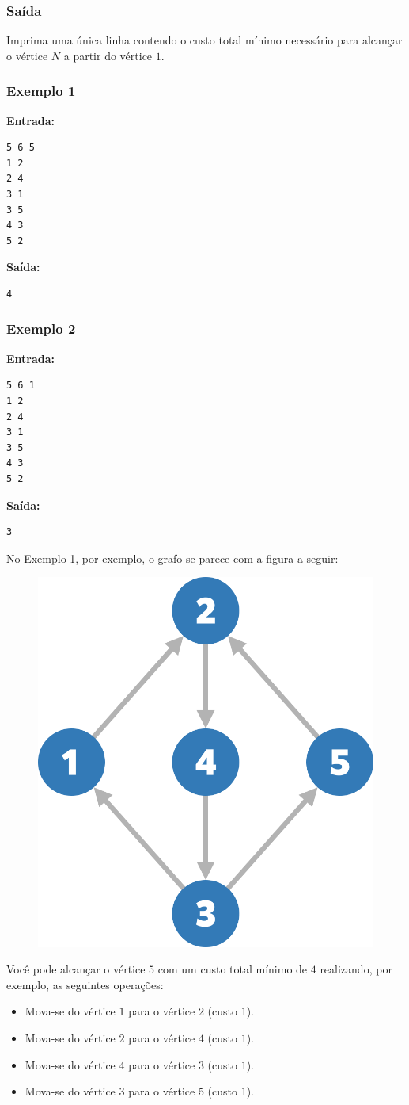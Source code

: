 \subsubsection*{Saída}
Imprima uma única linha contendo o custo total mínimo necessário para alcançar o vértice \(N\) a partir do vértice \(1\).

\subsubsection*{Exemplo 1}
\textbf{Entrada:}
\begin{verbatim}
5 6 5
1 2
2 4
3 1
3 5
4 3
5 2
\end{verbatim}
\textbf{Saída:}
\begin{verbatim}
4
\end{verbatim}

\subsubsection*{Exemplo 2}
\textbf{Entrada:}
\begin{verbatim}
5 6 1
1 2
2 4
3 1
3 5
4 3
5 2
\end{verbatim}
\textbf{Saída:}
\begin{verbatim}
3
\end{verbatim}

No Exemplo 1, por exemplo, o grafo se parece com a figura a seguir:

\begin{figure}
    \centering
    \includegraphics[width=0.5\linewidth]{flipEdge.png}
    \label{fig:enter-label}
\end{figure}

Você pode alcançar o vértice \(5\) com um custo total mínimo de \(4\) realizando, por exemplo, as seguintes operações:
\begin{itemize}
    \item Mova-se do vértice \(1\) para o vértice \(2\) (custo \(1\)).
    \item Mova-se do vértice \(2\) para o vértice \(4\) (custo \(1\)).
    \item Mova-se do vértice \(4\) para o vértice \(3\) (custo \(1\)).
    \item Mova-se do vértice \(3\) para o vértice \(5\) (custo \(1\)).
\end{itemize}

